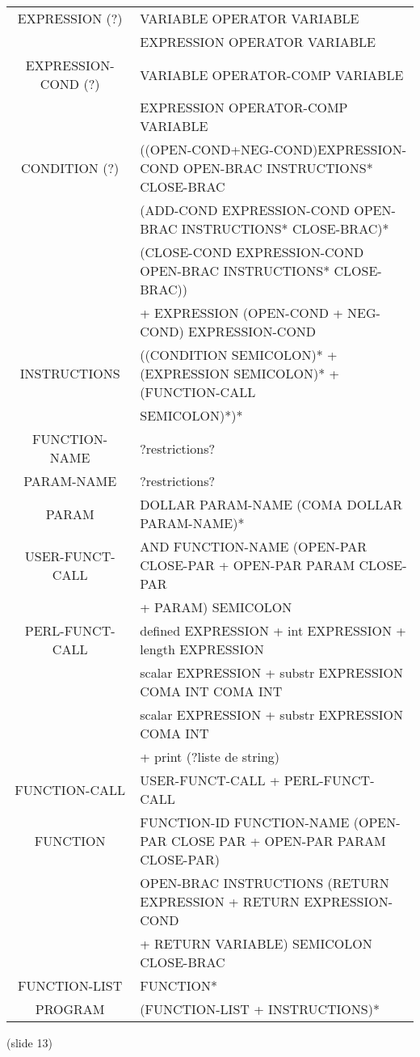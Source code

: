 \documentclass[a4paper,10pt]{article}
\begin{document}
\begin{tabular}{|c|l|}
EXPRESSION (?)		& VARIABLE OPERATOR VARIABLE   \\
					& EXPRESSION OPERATOR VARIABLE \\ \hline
EXPRESSION-COND (?)	& VARIABLE OPERATOR-COMP VARIABLE   \\
					& EXPRESSION OPERATOR-COMP VARIABLE \\ \hline
CONDITION (?)		& ((OPEN-COND+NEG-COND)EXPRESSION-COND OPEN-BRAC INSTRUCTIONS* CLOSE-BRAC\\
					& (ADD-COND EXPRESSION-COND OPEN-BRAC INSTRUCTIONS* CLOSE-BRAC)* \\
					& (CLOSE-COND EXPRESSION-COND OPEN-BRAC INSTRUCTIONS* CLOSE-BRAC))\\
					& + EXPRESSION (OPEN-COND + NEG-COND) EXPRESSION-COND \\ \hline
INSTRUCTIONS		& ((CONDITION SEMICOLON)* + (EXPRESSION SEMICOLON)* + (FUNCTION-CALL \\ 
					& SEMICOLON)*)* \\ \hline \hline


FUNCTION-NAME		& ?restrictions? \\ \hline
PARAM-NAME			& ?restrictions? \\ \hline
PARAM				& DOLLAR PARAM-NAME (COMA DOLLAR PARAM-NAME)* \\ \hline
USER-FUNCT-CALL		& AND FUNCTION-NAME (OPEN-PAR CLOSE-PAR + OPEN-PAR PARAM CLOSE-PAR  \\
					& + PARAM) SEMICOLON \\ \hline
PERL-FUNCT-CALL		& defined EXPRESSION + int EXPRESSION + length EXPRESSION \\ 
					& scalar EXPRESSION + substr EXPRESSION COMA INT COMA INT \\
					& scalar EXPRESSION + substr EXPRESSION COMA INT  \\
					& + print (?liste de string) \\ \hline
FUNCTION-CALL		& USER-FUNCT-CALL + PERL-FUNCT-CALL \\ \hline
FUNCTION			& FUNCTION-ID FUNCTION-NAME (OPEN-PAR CLOSE PAR + OPEN-PAR PARAM CLOSE-PAR) \\
					& OPEN-BRAC INSTRUCTIONS (RETURN EXPRESSION + RETURN EXPRESSION-COND \\
					& + RETURN VARIABLE) SEMICOLON CLOSE-BRAC \\ \hline
FUNCTION-LIST		& FUNCTION* \\ \hline
PROGRAM				& (FUNCTION-LIST + INSTRUCTIONS)*\\ \hline

					
					
\end{tabular}




(slide 13)
\end{document}
